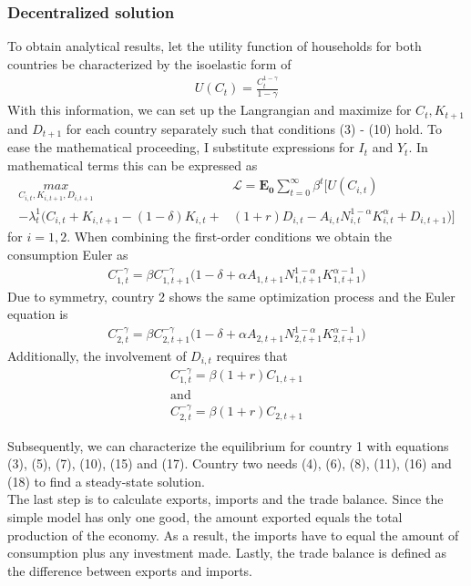 \documentclass{article}
\begin{document}
\subsubsection{Decentralized solution}

To obtain analytical results, let the utility function of households for both countries be characterized by the isoelastic form of
\begin{align}
U(C_t) = \frac{C_t^{1-\gamma}}{1-\gamma}
\end{align}
With this information, we can set up the Langrangian and maximize for $C_t, K_{t+1}$ and $D_{t+1}$ for each country separately such that conditions (3) - (10) hold. To ease the mathematical proceeding, I substitute expressions for $I_t$ and $Y_t$.
In mathematical terms this can be expressed as
\begin{align*}
\underset{C_{i, t}, K_{i, t+1}, D_{i, t+1}}{max} &\mathcal{L} = \mathbf{E_0} \sum_{t=0}^{\infty} \beta^t \Bigg[ U(C_{i, t}) \\ - \lambda_t^1 \Big( C_{i, t} + K_{i, t+1} - (1 - \delta)K_{i, t} + &(1+r)D_{i, t} - A_{i, t} N_{i, t}^{1-\alpha} K_{i, t}^{\alpha} + D_{i, t+1} \Big) \Bigg]
\end{align*}
for $i = 1,2$. When combining the first-order conditions we obtain the consumption Euler as 
\begin{align}
C_{1, t}^{-\gamma} = \beta C_{1, t+1}^{-\gamma} \big( 1 - \delta + \alpha A_{1, t+1} N_{1, t+1}^{1 - \alpha} K_{1, t+1}^{\alpha -1} \big)
\end{align}
Due to symmetry, country 2 shows the same optimization process and the Euler equation is 
\begin{align}
C_{2, t}^{-\gamma} = \beta C_{2, t+1}^{-\gamma} \big( 1 - \delta + \alpha A_{2, t+1} N_{2, t+1}^{1 - \alpha} K_{2, t+1}^{\alpha -1} \big)
\end{align}
Additionally, the involvement of $D_{i, t}$ requires that
\begin{align}
C_{1, t}^{-\gamma} = \beta (1 + r) C_{1, t+1} \\ \text{and} \\
C_{2, t}^{-\gamma} = \beta (1 + r) C_{2, t+1}
\end{align}

Subsequently, we can characterize the equilibrium for country 1 with equations (3), (5), (7), (10), (15) and (17). Country two needs (4), (6), (8), (11), (16) and (18) to find a steady-state solution. \\
The last step is to calculate exports, imports and the trade balance. Since the simple model has only one good, the amount exported equals the total production of the economy. As a result, the imports have to equal the amount of consumption plus any investment made. Lastly, the trade balance is defined as the difference between exports and imports.
\end{document}
